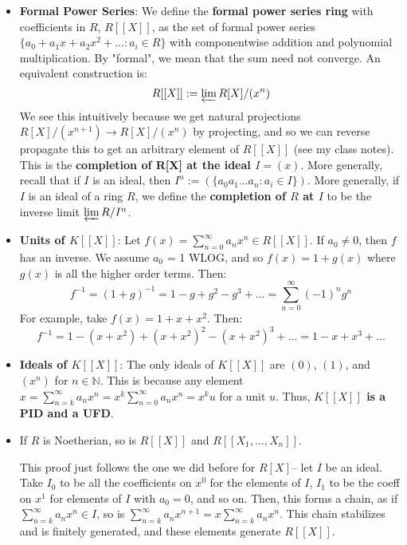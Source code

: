 \documentclass[11pt, oneside]{amsart}   	%
\theoremstyle{definition}
\begin{document}
\begin{itemize}

	\item \textbf{Formal Power Series}: We define the \textbf{formal power series ring} with coefficients in $R$, $R[[X]]$, as the set of formal power series 
	$\{a_0 + a_1x + a_2x^2 + ... : a_i\in R\}$ with componentwise addition and polynomial multiplication. By "formal", we mean that the sum need not 
	converge. An equivalent construction is:
	$$
		R[[X]] := \varprojlim R[X] / (x^n)
	$$
	We see this intuitively because we get natural projections $R[X] / (x^{n + 1})\rightarrow R[X] / (x^n)$ by projecting, and so we can reverse propagate 
	this to get an arbitrary element of $R[[X]]$ (see my class notes). This is the \textbf{completion of R[X] at the ideal $I = (x)$}. More generally, recall 
	that if $I$ is an ideal, then $I^n := (\{a_0a_1...a_n : a_i\in I\})$. More generally, if $I$ is an ideal of a ring $R$, we define the \textbf{completion of $R$ 
	at $I$} to be the inverse limit $\varprojlim R / I^n$. 
	
	\item \textbf{Units of $K[[X]]$}: Let $f(x) = \sum_{n = 0}^\infty a_nx^n\in R[[X]]$. If $a_0\neq 0$, then $f$ has an inverse. We assume $a_0$ = 1 
	WLOG, and so $f(x) = 1 + g(x)$ where $g(x)$ is all the higher order terms. Then:
	$$
		f^{-1} = (1 + g)^{-1} = 1 - g + g^2 - g^3 + ... = \sum_{n = 0}^\infty (-1)^ng^n
	$$
	For example, take $f(x) = 1 + x + x^2$. Then:
	$$
		f^{-1} = 1 - (x + x^2) + (x + x^2)^2 - (x + x^2)^3 + ... = 1 - x + x^3 + ...
	$$
	
	\item \textbf{Ideals of $K[[X]]$}: The only ideals of $K[[X]]$ are $(0)$, $(1)$, and $(x^n)$ for $n\in\mathbb N$. This is because any element 
	$x = \sum_{n = k}^\infty a_nx^n = x^k\sum_{n = 0}^\infty a_nx^n = x^k u$ for a unit $u$. Thus, \textbf{$K[[X]]$ is a PID and a UFD}.
	
	\item If $R$ is Noetherian, so is $R[[X]]$ and $R[[X_1, ..., X_n]]$. 
	
	This proof just follows the one we did before for $R[X]$-- let $I$ be an ideal. Take $I_0$ to be all the coefficients on $x^0$ for the elements of $I$, 
	$I_1$ to be the coeff on $x^1$ for elements of $I$ with $a_0 = 0$, and so on. Then, this forms a chain, as if $\sum_{n = k}^\infty a_nx^n\in I$, so is 
	$\sum_{n = k}^\infty a_nx^{n + 1} = x\sum_{n = k}^\infty a_nx^n$. This chain stabilizes and is finitely generated, and these elements generate 
	$R[[X]]$.
	

\end{itemize}
\end{document}
